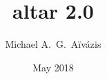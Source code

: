 %
%

\title[altar 2.0 -- May 2018]{altar 2.0}
\author[\url{michael.aivazis@para-sim.com}]{Michael A.~G.~A\"iv\'azis}
\date{May 2018}


